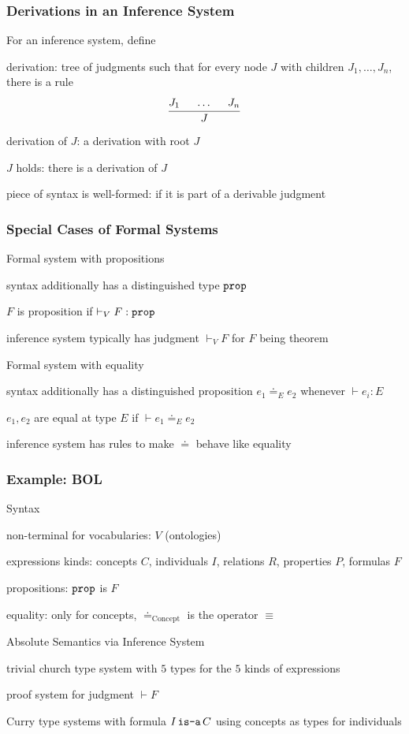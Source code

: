 \begin{frame}\frametitle{Derivations in an Inference System}
\begin{blockitems}{For an inference system, define}
\item derivation: tree of judgments such that for every node $J$ with children $J_1,\ldots,J_n$, there is a rule
\[\cfrac{J_1 \hspace*{.5cm} \ldots \hspace*{.5cm} J_n}{J}\,\]
\item derivation of $J$: a derivation with root $J$
\item $J$ holds: there is a derivation of $J$
\item piece of syntax is well-formed: if it is part of a derivable judgment
\end{blockitems}
\end{frame}

\begin{frame}\frametitle{Special Cases of Formal Systems}
\begin{blockitems}{Formal system with propositions}
\item syntax additionally has a distinguished type $\prop$
\item $F$ is proposition if $\vdash_V F:\prop$
\item inference system typically has judgment $\vdash_V F$ for $F$ being theorem
\end{blockitems}

\begin{blockitems}{Formal system with equality}
\item syntax additionally has a distinguished proposition $e_1\doteq_E e_2$ whenever $\vdash e_i:E$
\item $e_1,e_2$ are equal at type $E$ if $\vdash e_1\doteq_E e_2$
\item inference system has rules to make $\doteq$ behave like equality
\end{blockitems}
\end{frame}

\begin{frame}\frametitle{Example: BOL}
\begin{blockitems}{Syntax}
\item non-terminal for vocabularies: $V$ (ontologies)
\item expressions kinds: concepts $C$, individuals $I$, relations $R$, properties $P$, formulas $F$
\item propositions: $\prop$ is $F$
\item equality: only for concepts, $\doteq_{\mathrm{Concept}}$ is the operator $\equiv$
\end{blockitems}

\begin{blockitems}{Absolute Semantics via Inference System}
\item trivial church type system with $5$ types for the $5$ kinds of expressions
\item proof system for judgment $\vdash F$
\item Curry type systems with formula $I \mathop{\texttt{is-a}} C$ using concepts as types for individuals
\end{blockitems}
\end{frame}

